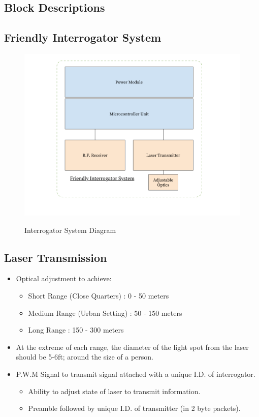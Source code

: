 \documentclass[openbib,letterpaper,10pt]{article}
\begin{document}
\begin{spacing}{1.15}
\subsection{Block Descriptions}
\subsection*{Friendly Interrogator System}
\begin{figure} [H]
	\centering
	\includegraphics[scale=0.35]{Interrogator_Diagram.png}
	\label{fig:system-diagram}
	\vspace{-10mm}
	\caption{Interrogator System Diagram}
\end{figure}

\subsection*{{\normalsize Laser Transmission}}
\begin{itemize}
	\item Optical adjustment to achieve:
	\begin{itemize}
		\item Short Range (Close Quarters) : 0 - 50 meters
		\item Medium Range (Urban Setting) : 50 - 150 meters
		\item Long Range : 150 - 300 meters
	\end{itemize}
	\item At the extreme of each range, the diameter of the light spot from the laser should be 5-6ft; around the size of a person. 
	\item P.W.M Signal to transmit signal attached with a unique I.D. of interrogator.
		\begin{itemize}
			\item Ability to adjust state of laser to transmit information.
			\item Preamble followed by unique I.D. of transmitter (in 2 byte packets).
		\end{itemize}
\end{itemize}


\end{spacing}
\end{document}
